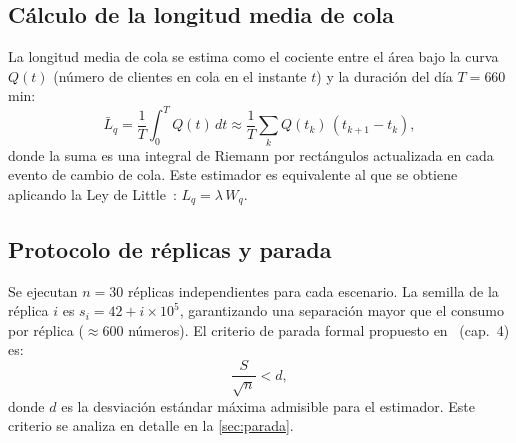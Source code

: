 \subsection{Cálculo de la longitud media de cola}

La longitud media de cola se estima como el cociente entre el área bajo la
curva $Q(t)$ (número de clientes en cola en el instante $t$) y la duración
del día $T = 660$ min:
\begin{equation}
  \bar{L}_q = \frac{1}{T}\int_0^T Q(t)\,dt
  \approx \frac{1}{T}\sum_k Q(t_k)\,(t_{k+1} - t_k),
  \label{eq:area_cola}
\end{equation}
donde la suma es una integral de Riemann por rectángulos actualizada en cada
evento de cambio de cola.
Este estimador es equivalente al que se obtiene aplicando la Ley de
Little~\citep{little1961proof}: $L_q = \lambda\,W_q$.

\subsection{Protocolo de réplicas y parada}

Se ejecutan $n = 30$ réplicas independientes para cada escenario.
La semilla de la réplica $i$ es $s_i = 42 + i \times 10^5$, garantizando
una separación mayor que el consumo por réplica (${\approx}600$ números).
El criterio de parada formal propuesto en~\citet{curso_temas} (cap.~4) es:
\begin{equation}
  \frac{S}{\sqrt{n}} < d,
  \label{eq:parada_temas}
\end{equation}
donde $d$ es la desviación estándar máxima admisible para el estimador.
Este criterio se analiza en detalle en la \cref{sec:parada}.
